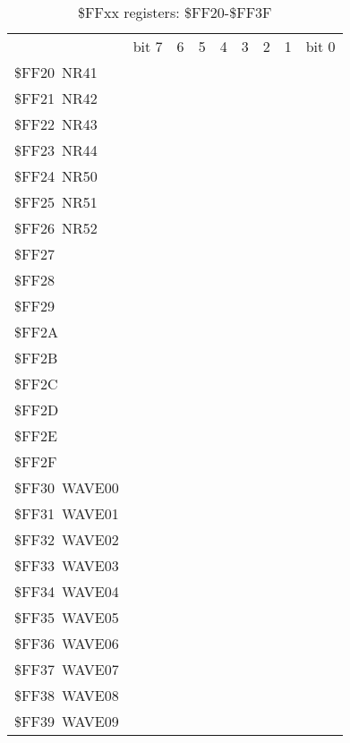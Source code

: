 \begin{landscape}
\begin{table}
  \begin{center}
    \everyrow{\hline}
    \caption{\$FFxx registers: \$FF20-\$FF3F}
    \ttfamily
    \begin{tabu} to \linewidth {|X[l]|X[c]|X[c]|X[c]|X[c]|X[c]|X[c]|X[c]|X[c]|}
      \rowfont{\small}
      & bit 7 & 6 & 5 & 4 & 3 & 2 & 1 & bit 0 \\
      \$FF20~NR41 & & & & & & & & \\
      \$FF21~NR42 & & & & & & & & \\
      \$FF22~NR43 & & & & & & & & \\
      \$FF23~NR44 & & & & & & & & \\
      \$FF24~NR50 & & & & & & & & \\
      \$FF25~NR51 & & & & & & & & \\
      \$FF26~NR52 & & & & & & & & \\
      \$FF27 &  \\
      \$FF28 &  \\
      \$FF29 &  \\
      \$FF2A &  \\
      \$FF2B &  \\
      \$FF2C &  \\
      \$FF2D &  \\
      \$FF2E &  \\
      \$FF2F &  \\
      \$FF30~WAVE00 & & & & & & & & \\
      \$FF31~WAVE01 & & & & & & & & \\
      \$FF32~WAVE02 & & & & & & & & \\
      \$FF33~WAVE03 & & & & & & & & \\
      \$FF34~WAVE04 & & & & & & & & \\
      \$FF35~WAVE05 & & & & & & & & \\
      \$FF36~WAVE06 & & & & & & & & \\
      \$FF37~WAVE07 & & & & & & & & \\
      \$FF38~WAVE08 & & & & & & & & \\
      \$FF39~WAVE09 & & & & & & & & \\

\end{tabu}
\end{center}
\end{table}
\end{landscape}
